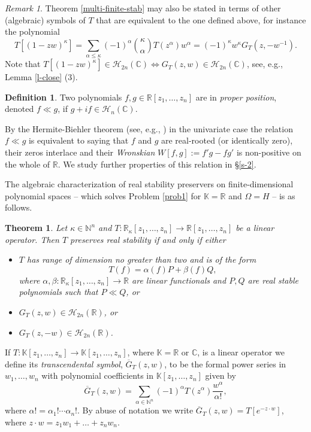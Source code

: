 \documentclass[10pt,reqno]{amsart}
\theoremstyle{plain}
\newtheorem{theorem}{Theorem}[section]
\theoremstyle{definition}
\newtheorem{definition}{Definition}[section]
\theoremstyle{remark}
\newtheorem{remark}{Remark}[section]
\numberwithin{equation}{section}
\newcommand{\NN}{\mathbb{N}}
\newcommand{\HH}{\mathcal{H}}
\newcommand{\RR}{\mathbb{R}}
\newcommand{\CC}{\mathbb{C}}
\newcommand{\KK}{\mathbb{K}}
\begin{document}
\begin{remark}\label{def-symb}
Theorem \ref{multi-finite-stab} may also be stated in terms of other
(algebraic) symbols of $T$ that are equivalent to the one defined above,
for instance the polynomial
$$
T[(1-zw)^\kappa]
= \sum_{\alpha \leq \kappa}(-1)^{\alpha}\binom \kappa \alpha 
T(z^\alpha)w^{\alpha}=(-1)^{\kappa}w^{\kappa}G_T(z,-w^{-1}).
$$
Note that $T[(1-zw)^\kappa]\in\HH_{2n}(\CC)\Leftrightarrow 
G_T(z,w)\in \HH_{2n}(\CC)$, see, e.g., Lemma \ref{l-close} (3).
\end{remark}

\begin{definition}\label{d-pp}
Two polynomials $f,g \in \RR[z_1,\ldots,z_n]$ are in 
{\em proper position}, denoted $f \ll g$, if $g+if \in \HH_n(\CC)$.
\end{definition} 

By the Hermite-Biehler theorem (see, e.g., \cite[Theorem 6.3.4]{RS}) 
in the univariate case the relation $f\ll g$ is equivalent to saying that
$f$ and $g$ are real-rooted (or identically zero), their zeros interlace
and their {\em Wronskian} $W[f,g]:=f'g-fg'$ is non-positive on the whole of 
$\RR$. We study further properties of this relation in \S \ref{s-2}.

The algebraic characterization of real stability preservers on 
finite-dimensional polynomial spaces -- which solves 
Problem \ref{prob1} for $\KK=\RR$ and $\Omega=H$ -- is as follows.

\begin{theorem}\label{multi-finite-hyp}
Let $\kappa \in \NN^n$ and 
$T : \RR_\kappa[z_1,\ldots, z_n] \rightarrow \RR[z_1,\ldots, z_n]$ be a 
linear operator. Then $T$ preserves real stability if and only if either
\begin{itemize}
\item[(a)] $T$ has range of dimension no greater than two and is of the form 
$$
T(f) = \alpha(f)P + \beta(f)Q,
$$
where $\alpha, \beta: \RR_\kappa[z_1,\ldots, z_n] \rightarrow \RR$ are 
linear functionals and $P,Q$ are real stable polynomials such that 
$P \ll Q$, or 
\item[(b)] $G_T(z,w)\in \HH_{2n}(\RR)$, or 
\item[(c)] $G_T(z,-w)\in \HH_{2n}(\RR)$. 
\end{itemize}
\end{theorem}

If $T : \KK[z_1,\ldots, z_n] \rightarrow \KK[z_1,\ldots,z_n]$, where 
$\KK=\RR$ or 
$\CC$, is a linear operator 
we define its {\em transcendental symbol}, $\overline{G}_T(z,w)$, to be the 
formal power series in $w_1, \ldots, w_n$ with polynomial coefficients in 
$\KK[z_1,\ldots,z_n]$ given by 
$$
\overline{G}_T(z,w)
=\sum_{\alpha \in \NN^n} (-1)^\alpha T(z^\alpha)
\frac {w^\alpha}{\alpha!}, 
$$
where  
$\alpha!= \alpha_1! \cdots \alpha_n!$. By abuse of notation we write
$\overline{G}_T(z,w) =T[e^{-z\cdot w}]$, where 
$z\cdot w=z_1w_1+\ldots+z_nw_n$.
\end{document}
